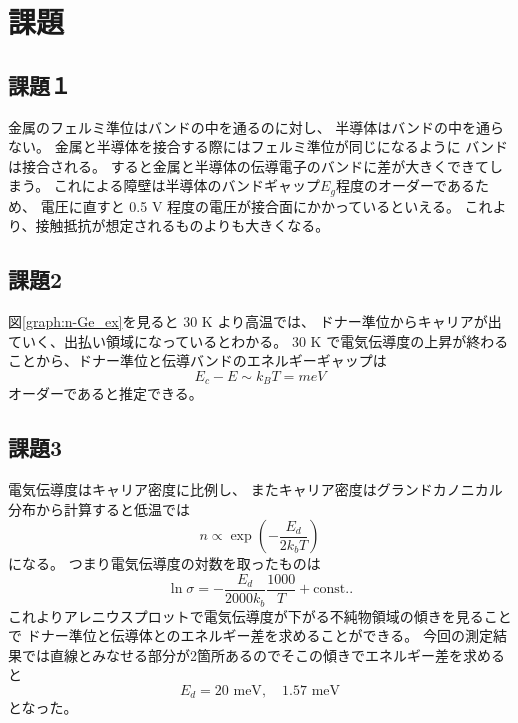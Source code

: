 \documentclass[11pt,dvipdfmx,a4paper]{jsarticle}
\begin{document}
\section{課題}
\subsection*{課題１}
金属のフェルミ準位はバンドの中を通るのに対し、
半導体はバンドの中を通らない。
金属と半導体を接合する際にはフェルミ準位が同じになるように
バンドは接合される。
すると金属と半導体の伝導電子のバンドに差が大きくできてしまう。
これによる障壁は半導体のバンドギャップ\(E_g\)程度のオーダーであるため、
電圧に直すと 0.5 V 程度の電圧が接合面にかかっているといえる。
これより、接触抵抗が想定されるものよりも大きくなる。

\subsection*{課題2}
図\ref{graph:n-Ge_ex}を見ると 30 K より高温では、
ドナー準位からキャリアが出ていく、出払い領域になっているとわかる。
30 K で電気伝導度の上昇が終わることから、ドナー準位と伝導バンドのエネルギーギャップは
\begin{equation}
    E_c - E \sim k_B T = meV
\end{equation}
オーダーであると推定できる。

\subsection*{課題3}
電気伝導度はキャリア密度に比例し、
またキャリア密度はグランドカノニカル分布から計算すると低温では
\begin{equation}
    n \propto \exp(-\frac{E_d}{2k_bT})
\end{equation}
になる。
つまり電気伝導度の対数を取ったものは
\begin{equation}
    \ln \sigma = -\frac{E_d}{2000k_b} \frac{1000}{T} + \text{const.}.
\end{equation}
これよりアレニウスプロットで電気伝導度が下がる不純物領域の傾きを見ることで
ドナー準位と伝導体とのエネルギー差を求めることができる。
今回の測定結果では直線とみなせる部分が2箇所あるのでそこの傾きでエネルギー差を求めると
\begin{equation}
    E_d = 20 \text{ meV},\quad 1.57 \text{ meV}
\end{equation}
となった。
\end{document}
